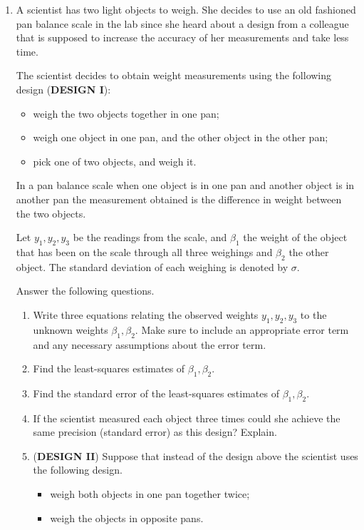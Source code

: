 \documentclass[11pt, oneside]{article}   	%
\begin{document}
\begin{enumerate}

\item A scientist has two light objects to weigh.  She decides to use an old fashioned pan balance scale in the lab since she heard about a design from a colleague that is supposed to increase the accuracy of her measurements and take less time.  

The scientist decides to obtain weight measurements using the following design ({\bf{DESIGN I}}):

\begin{itemize}
\item weigh the two objects together in one pan;
\item weigh one object in one pan, and the other object in the other pan;
\item pick one of two objects, and weigh it.
\end{itemize}

In a pan balance scale when one object is in one pan and another object is in another pan the measurement obtained is the difference in weight between the two objects.

Let $y_1,y_2,y_3$ be the readings from the scale, and $\beta_1$ the weight of the object that has been on the scale through all three weighings and $\beta_2$ the other object. The standard deviation of each weighing is denoted by  $\sigma$.  

Answer the following questions.

\begin{enumerate}

\item Write three equations relating the observed weights $y_1,y_2,y_3$ to the unknown weights $\beta_1,\beta_2$.  Make sure to include an appropriate error term and any necessary assumptions about the error term. 
\item Find the least-squares estimates of $\beta_1,\beta_2$.
\item Find the standard error of the least-squares estimates of $\beta_1,\beta_2$.
\item If the scientist measured each object three times could she achieve the same precision (standard error) as this design?  Explain. 

\item ({\bf DESIGN II}) Suppose that instead of the design above the scientist uses the following design.

\begin{itemize}
\item weigh both objects in one pan together twice;
\item weigh the objects in opposite pans.
\end{itemize}




\end{enumerate}
\end{enumerate}
\end{document}
